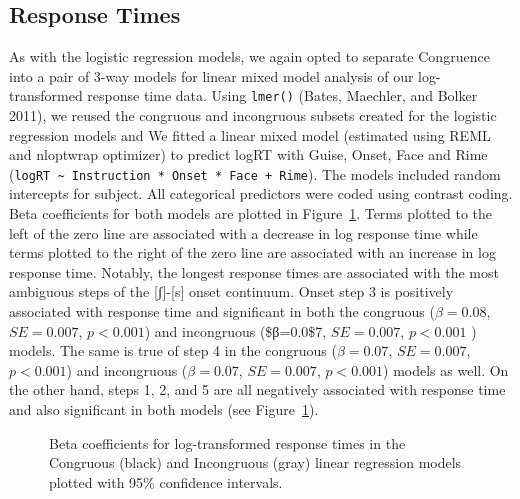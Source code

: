 \documentclass[
  letterpaper,
  DIV=11,
  numbers=noendperiod]{scrartcl}
\begin{document}
\subsection{Response Times}\label{sec-results-rt}

As with the logistic regression models, we again opted to separate
Congruence into a pair of 3-way models for linear mixed model analysis
of our log-transformed response time data. Using \texttt{lmer()} (Bates,
Maechler, and Bolker 2011), we reused the congruous and incongruous
subsets created for the logistic regression models and We fitted a
linear mixed model (estimated using REML and nloptwrap optimizer) to
predict logRT with Guise, Onset, Face and Rime
(\texttt{logRT\ \textasciitilde{}\ Instruction\ *\ Onset\ *\ Face\ +\ Rime}).
The models included random intercepts for subject. All categorical
predictors were coded using contrast coding. Beta coefficients for both
models are plotted in Figure~\ref{fig-coefs-logRT}. Terms plotted to the
left of the zero line are associated with a decrease in log response
time while terms plotted to the right of the zero line are associated
with an increase in log response time. Notably, the longest response
times are associated with the most ambiguous steps of the
{[}ʃ{]}-{[}s{]} onset continuum. Onset step 3 is positively associated
with response time and significant in both the congruous (\(β=0.08\),
\(SE=0.007\), \(p < 0.001\)) and incongruous (\$β=0.0\$7, \(SE=0.007\),
\(p < 0.001\) ) models. The same is true of step 4 in the congruous
(\(β=0.07\), \(SE=0.007\), \(p < 0.001\)) and incongruous (\(β=0.07\),
\(SE=0.007\), \(p < 0.001\)) models as well. On the other hand, steps 1,
2, and 5 are all negatively associated with response time and also
significant in both models (see Figure~\ref{fig-coefs-logRT}).

\begin{figure}


\caption{\label{fig-coefs-logRT}Beta coefficients for log-transformed
response times in the Congruous (black) and Incongruous (gray) linear
regression models plotted with 95\% confidence intervals.}

\end{figure}%
\end{document}
